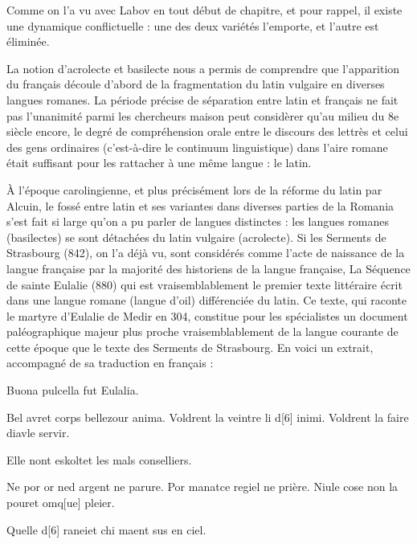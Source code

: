 Comme on l’a vu avec Labov en tout début de chapitre, et pour rappel, il existe une dynamique conflictuelle : une des deux variétés l’emporte, et l’autre est éliminée.




La notion d’acrolecte et basilecte nous a permis de comprendre que l’apparition du français découle d’abord de la fragmentation du latin vulgaire en diverses langues romanes. La période précise de séparation entre latin et français ne fait pas l’unanimité parmi les chercheurs maison peut considèrer qu’au milieu du 8e siècle encore, le degré de compréhension orale entre le discours des lettrès et celui des gens ordinaires (c’est-à-dire le continuum linguistique) dans l’aire romane était suffisant pour les rattacher à une même langue : le latin.



À l’époque carolingienne, et plus précisément lors de la réforme du latin par Alcuin, le fossé entre latin et ses variantes dans diverses parties de la Romania s’est fait si large qu’on a pu parler de langues distinctes : les langues romanes (basilectes) se sont détachées du latin vulgaire (acrolecte). Si les Serments de Strasbourg (842), on l’a déjà vu, sont considérés comme l’acte de naissance de la langue française par la majorité des historiens de la langue française, La Séquence de sainte Eulalie (880) qui est vraisemblablement le premier texte littéraire écrit dans une langue romane (langue d’oil) différenciée du latin. Ce texte, qui raconte le martyre d’Eulalie de Medir en 304, constitue pour les spécialistes un document paléographique majeur plus proche vraisemblablement de la langue courante de cette époque que le texte des Serments de Strasbourg. En voici un extrait, accompagné de sa traduction en français :



Buona pulcella fut Eulalia.


Bel avret corps bellezour anima. Voldrent la veintre li d[6] inimi. Voldrent la faire diavle servir.


Elle nont eskoltet les mals conselliers.


Ne por or ned argent ne parure. Por manatce regiel ne prière. Niule cose non la pouret omq[ue] pleier.


Quelle d[6] raneiet chi maent sus en ciel.


